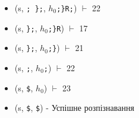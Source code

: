 \begin{itemize}
    \item[]  (s, \quad \verb|; };|,                              \quad $h_{0}$\verb|;}R;|)         $\vdash$ 22
    \item[]  (s, \quad \verb|};|,                                \quad $h_{0}$\verb|;}R|)          $\vdash$ 17
    \item[]  (s, \quad \verb|};|,                                \quad $h_{0}$\verb|;}|)           $\vdash$ 21
    \item[]  (s, \quad \verb|;|,                                 \quad $h_{0}$\verb|;|)            $\vdash$ 22
    \item[]  (s, \quad \verb|$|,                                 \quad $h_{0}$)                    $\vdash$ 23
    \item[]  (s, \quad \verb|$|,                                 \quad \verb|$|) - Успішне розпізнавання
\end{itemize}
